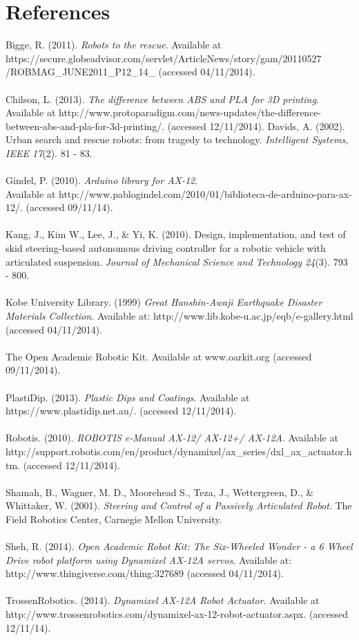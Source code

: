 \documentclass[]{article}
\begin{document}
\section{References}
Bigge, R. (2011). \textit{Robots to the rescue}. Available at\\
https://secure.globeadvisor.com/servlet/ArticleNews/story/gam/20110527\\
/ROBMAG\_JUNE2011\_P12\_14\_ (accessed 04/11/2014).\\
\\
Chilson, L. (2013). \textit{The difference between ABS and PLA for 3D printing}. Available at http://www.protoparadigm.com/news-updates/the-difference-between-abs-and-pla-for-3d-printing/. (accessed 12/11/2014).
Davids, A. (2002). Urban search and rescue robots: from tragedy to technology. \textit{Intelligent Systems, IEEE 17}(2). 81 - 83.\\
\\
Gindel, P. (2010). \textit{Arduino library for AX-12}. \\Available at http://www.pablogindel.com/2010/01/biblioteca-de-arduino-para-ax-12/. (accessed 09/11/14).\\
\\
Kang, J., Kim W., Lee, J., \& Yi, K. (2010). Design, implementation, and test of skid steering-based autonomous driving controller for a robotic vehicle with articulated suspension. \textit{Journal of Mechanical Science and Technology 24}(3). 793 - 800.\\
\\
Kobe University Library. (1999) \textit{Great Hanshin-Awaji Earthquake Disaster Materials Collection.} Available at: http://www.lib.kobe-u.ac.jp/eqb/e-gallery.html (accessed 04/11/2014).\\
\\
The Open Academic Robotic Kit. Available at www.oarkit.org (accessed 09/11/2014).\\
\\
PlastiDip. (2013). \textit{Plastic Dips and Coatings}. Available at https://www.plastidip.net.au/. (accessed 12/11/2014).\\
\\
Robotis. (2010). \textit{ROBOTIS e-Manual AX-12/ AX-12+/ AX-12A}. Available at http://support.robotis.com/en/product/dynamixel/ax\_series/dxl\_ax\_actuator.htm. (accessed 12/11/2014).\\
\\
Shamah, B.,  Wagner, M. D., Moorehead S., Teza, J., Wettergreen, D., \& Whittaker, W. (2001). \textit{Steering and Control of a Passively Articulated Robot}. The Field Robotics Center, Carnegie Mellon University.\\
\\
Sheh, R. (2014). \textit{Open Academic Robot Kit: The Six-Wheeled Wonder - a 6 Wheel Drive robot platform using Dynamixel AX-12A servos}. Available at: http://www.thingiverse.com/thing:327689 (accessed 04/11/2014).\\
\\
TrossenRobotics. (2014). \textit{Dynamixel AX-12A Robot Actuator}. Available at http://www.trossenrobotics.com/dynamixel-ax-12-robot-actuator.aspx. (accessed 12/11/14).
\end{document}
